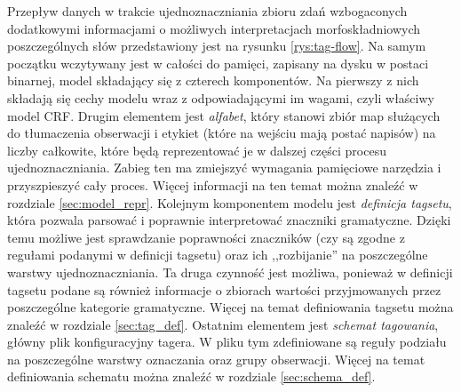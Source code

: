 \documentclass[a4paper,10]{article}
\begin{document}
Przepływ danych w trakcie ujednoznaczniania zbioru zdań wzbogaconych dodatkowymi informacjami
o możliwych interpretacjach morfoskładniowych poszczególnych słów przedstawiony jest
na rysunku \ref{rys:tag-flow}.
Na samym początku wczytywany jest w całości do pamięci, zapisany na dysku w postaci
binarnej, model składający się z czterech komponentów. Na pierwszy z nich składają
się cechy modelu wraz z odpowiadającymi im wagami, czyli właściwy model CRF.
Drugim elementem jest \emph{alfabet}, który stanowi zbiór map służących
do tłumaczenia obserwacji i etykiet (które na wejściu mają postać
napisów) na liczby całkowite, które będą reprezentować je w dalszej części
procesu ujednoznaczniania. Zabieg ten ma zmiejszyć wymagania pamięciowe
narzędzia i przyszpieszyć cały proces.
Więcej informacji na ten temat można znaleźć w rozdziale \ref{sec:model_repr}. 
Kolejnym komponentem modelu jest \emph{definicja tagsetu}, która pozwala parsować i
poprawnie interpretować znaczniki gramatyczne. Dzięki temu możliwe
jest sprawdzanie poprawności znaczników (czy są zgodne z regułami
podanymi w definicji tagsetu) oraz ich ,,rozbijanie'' na poszczególne
warstwy ujednoznaczniania. Ta druga czynność jest możliwa, ponieważ w definicji
tagsetu podane są również informacje o zbiorach wartości przyjmowanych
przez poszczególne kategorie gramatyczne. 
Więcej na temat definiowania tagsetu można znaleźć w rozdziale \ref{sec:tag_def}.
Ostatnim elementem jest \emph{schemat tagowania}, główny plik konfiguracyjny tagera. 
W pliku tym zdefiniowane są reguły podziału na poszczególne warstwy oznaczania
oraz grupy obserwacji. Więcej na temat definiowania schematu można znaleźć
w rozdziale \ref{sec:schema_def}.
\end{document}
